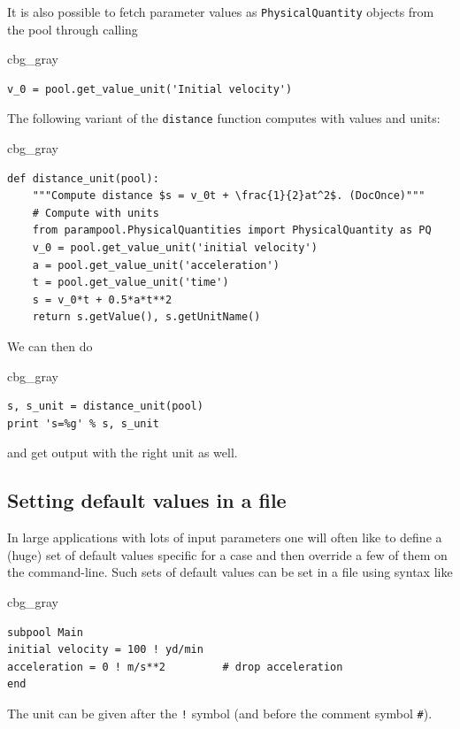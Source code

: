 \documentclass[graybox,envcountchap,sectrefs,final]{svmonodo}
\newenvironment{_cod_tight}[1]{
   \def\FrameCommand{\colorbox{#1}}
   \FrameRule0.6pt\MakeFramed {\FrameRestore}\vskip3mm}
   {\vskip0mm\endMakeFramed}
\newenvironment{cod}[1]{
\bgroup\rmfamily
\fboxsep=0mm\relax
\begin{_cod_tight}{#1}
\list{}{\parsep=-2mm\parskip=0mm\topsep=0pt\leftmargin=2mm
\rightmargin=2\leftmargin\leftmargin=4pt\relax}
\item\relax}
{\endlist\end{_cod_tight}\egroup}
\begin{document}
It is also possible to fetch parameter values as \texttt{PhysicalQuantity}
objects from the pool through calling

\begin{cod}{cbg_gray}\begin{Verbatim}[numbers=none,fontsize=\fontsize{9pt}{9pt},baselinestretch=0.95,xleftmargin=2mm]
v_0 = pool.get_value_unit('Initial velocity')
\end{Verbatim}
\end{cod}
\noindent
The following variant of the \texttt{distance} function computes with
values and units:

\begin{cod}{cbg_gray}\begin{Verbatim}[numbers=none,fontsize=\fontsize{9pt}{9pt},baselinestretch=0.95,xleftmargin=2mm]
def distance_unit(pool):
    """Compute distance $s = v_0t + \frac{1}{2}at^2$. (DocOnce)"""
    # Compute with units
    from parampool.PhysicalQuantities import PhysicalQuantity as PQ
    v_0 = pool.get_value_unit('initial velocity')
    a = pool.get_value_unit('acceleration')
    t = pool.get_value_unit('time')
    s = v_0*t + 0.5*a*t**2
    return s.getValue(), s.getUnitName()
\end{Verbatim}
\end{cod}
\noindent
We can then do

\begin{cod}{cbg_gray}\begin{Verbatim}[numbers=none,fontsize=\fontsize{9pt}{9pt},baselinestretch=0.95,xleftmargin=2mm]
s, s_unit = distance_unit(pool)
print 's=%g' % s, s_unit
\end{Verbatim}
\end{cod}
\noindent
and get output with the right unit as well.

\subsection{Setting default values in a file}

In large applications with lots of input parameters one will often like
to define a (huge) set of default values specific for a case and then
override a few of them on the command-line. Such sets of default values
can be set in a file using syntax like

\begin{cod}{cbg_gray}\begin{Verbatim}[numbers=none,fontsize=\fontsize{9pt}{9pt},baselinestretch=0.95,xleftmargin=2mm]
subpool Main
initial velocity = 100 ! yd/min
acceleration = 0 ! m/s**2         # drop acceleration
end
\end{Verbatim}
\end{cod}
\noindent
The unit can be given after the \Verb?!? symbol (and before the comment symbol \Verb!#!).
\end{document}
